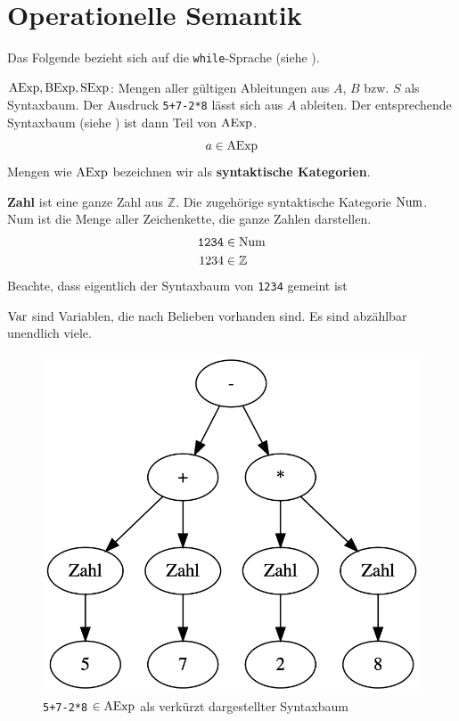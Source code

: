 \section{Operationelle Semantik}

Das Folgende bezieht sich auf die \texttt{while}-Sprache (siehe ).

\begin{definition}
    $\operatorname{AExp}, \operatorname{BExp}, \operatorname{SExp}$: Mengen aller gültigen Ableitungen aus $A$, $B$ bzw. $S$ als Syntaxbaum. Der Ausdruck \texttt{5+7-2*8} lässt sich aus $A$ ableiten. Der entsprechende Syntaxbaum (siehe ) ist dann Teil von $\operatorname{AExp}$.
    \[
    a \in \operatorname{AExp}
    \]
    Mengen wie $\operatorname{AExp}$ bezeichnen wir als \textbf{syntaktische Kategorien}.

    \textbf{Zahl} ist eine ganze Zahl aus $\mathbb{Z}$. Die zugehörige syntaktische Kategorie $\operatorname{Num}$. Num ist die Menge aller Zeichenkette, die ganze Zahlen darstellen.
    \begin{align*}
        \texttt{1234} & \in \operatorname{Num} \\
        1234 & \in \mathbb{Z}
    \end{align*}
    Beachte, dass eigentlich der Syntaxbaum von \texttt{1234} gemeint ist

    $\operatorname{Var}$ sind Variablen, die nach Belieben vorhanden sind. Es sind abzählbar unendlich viele.
\end{definition}

\begin{figure}[H]
    \centering
    \includegraphics[width=.4\textwidth]{syntaxbaum.png}
    \caption{\texttt{5+7-2*8} $\in \operatorname{AExp}$ als verkürzt dargestellter Syntaxbaum}
    \label{fig:syntaxbaum}
\end{figure}

